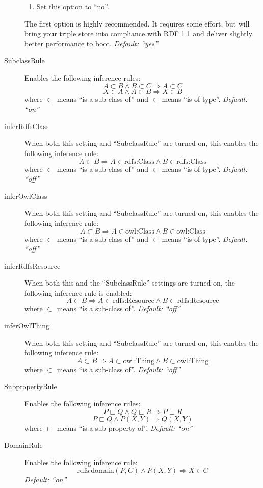 \begin{description}
\begin{enumerate}
		\item Set this option to ``no''.
	\end{enumerate}
	The first option is highly recommended.  It requires some effort, but will bring your triple store into compliance with RDF 1.1 and deliver slightly better performance to boot.  \emph{Default: ``yes''}

	\item[SubclassRule] Enables the following inference rules:
\[A \subset B \land B \subset C \Rightarrow A \subset C\]
\[X \in A \land A \subset B \Rightarrow X \in B\]
where $\subset$ means ``is a sub-class of'' and $\in$ means ``is of type''. \emph{Default: ``on''}

	\item[inferRdfsClass] When both this setting and ``SubclassRule'' are turned on, this enables the following inference rule:
\[A \subset B \Rightarrow A \in \text{rdfs:Class} \land B \in \text{rdfs:Class}\]
where $\subset$ means ``is a sub-class of'' and $\in$ means ``is of type''. \emph{Default: ``off''}

	\item[inferOwlClass] When both this setting and ``SubclassRule'' are turned on, this enables the following inference rule:
\[A \subset B \Rightarrow A \in \text{owl:Class} \land B \in \text{owl:Class}\]
where $\subset$ means ``is a sub-class of'' and $\in$ means ``is of type''. \emph{Default: ``off''}

	\item[inferRdfsResource] When both this and the ``SubclassRule'' settings are turned on, the following inference rule is enabled:
\[A \subset B \Rightarrow A \subset \text{rdfs:Resource} \land B \subset \text{rdfs:Resource}\]
where $\subset$ means ``is a sub-class of''. \emph{Default: ``off''}

	\item[inferOwlThing] When both this setting and ``SubclassRule'' are turned on, this enables the following inference rule:
\[A \subset B \Rightarrow A \subset \text{owl:Thing} \land B \subset \text{owl:Thing}\]
where $\subset$ means ``is a sub-class of''. \emph{Default: ``off''}

	\item[SubpropertyRule] Enables the following inference rules:
\[P \sqsubset Q \land Q \sqsubset R \Rightarrow P \sqsubset R\]
\[P \sqsubset Q \land P(X, Y) \Rightarrow Q(X, Y)\]
where $\sqsubset$ means ``is a sub-property of''. \emph{Default: ``on''}

	\item[DomainRule] Enables the following inference rule:
\[\text{rdfs:domain}(P,C) \land P(X, Y) \Rightarrow X \in C\]
\emph{Default: ``on''}


\end{description}

